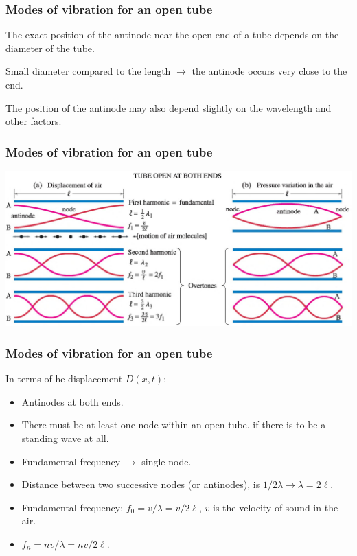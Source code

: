\documentclass[]{beamer}
\begin{document}



\begin{frame}
\frametitle{Modes of vibration for an open tube}

The exact position of the antinode near the open end of a tube depends on the diameter of the tube.
\vspace{3mm}
\pause


Small diameter  compared to the length $\rightarrow$ the antinode occurs very close to
the end. 
\vspace{3mm}
\pause


The position of the antinode may also depend slightly on the wavelength and other factors.


  \end{frame}





\begin{frame}
\frametitle{Modes of vibration for an open tube}

  \begin{center}
  \includegraphics[height=2.in]{images4/tubeopen.jpg}
\end{center}


  \end{frame}







\begin{frame}
\frametitle{Modes of vibration for an open tube}

In terms of he displacement $D(x,t)$:

\begin{itemize}
\item Antinodes at both ends.
\pause
\item  There must be at least one node within an open tube.
if there is to be a standing wave at all.
\pause
\item Fundamental frequency $\rightarrow$ single node. 
\pause
\item Distance between two successive nodes (or antinodes),  is  $1/2\lambda\rightarrow \lambda=2\ell$.
\pause
\item Fundamental frequency: $f_0=v /\lambda=v/2\ell$, $v$ is the velocity of sound in the air.
\pause
\item  $f_n=n v /\lambda=n v/2\ell$.
\end{itemize}


  \end{frame}
\end{document}
